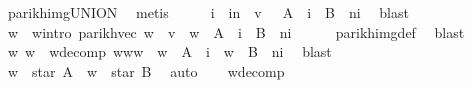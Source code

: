 \begin{isabellebody}
\ parikh{\isacharunderscore}{\kern0pt}img{\isacharunderscore}{\kern0pt}UNION\ \isamarkupfalse%
\ metis\isanewline
\ \ \isamarkupfalse%
\ \isamarkupfalse%
\ i\ \ {\isachardoublequoteopen}i{\isasymle}n\ {\isasymand}\ v\ {\isasymin}\ {\isasymPsi}\ {\isacharparenleft}{\kern0pt}A\ {\isacharcircum}{\kern0pt}{\isacharcircum}{\kern0pt}\ i\ {\isacharat}{\kern0pt}{\isacharat}{\kern0pt}\ B\ {\isacharcircum}{\kern0pt}{\isacharcircum}{\kern0pt}\ {\isacharparenleft}{\kern0pt}n{\isacharminus}{\kern0pt}i{\isacharparenright}{\kern0pt}{\isacharparenright}{\kern0pt}{\isachardoublequoteclose}\ \isamarkupfalse%
\ blast\isanewline
\ \ \isamarkupfalse%
\ \isamarkupfalse%
\ w\ \ w{\isacharunderscore}{\kern0pt}intro{\isacharcolon}{\kern0pt}\ {\isachardoublequoteopen}parikh{\isacharunderscore}{\kern0pt}vec\ w\ {\isacharequal}{\kern0pt}\ v\ {\isasymand}\ w\ {\isasymin}\ A\ {\isacharcircum}{\kern0pt}{\isacharcircum}{\kern0pt}\ i\ {\isacharat}{\kern0pt}{\isacharat}{\kern0pt}\ B\ {\isacharcircum}{\kern0pt}{\isacharcircum}{\kern0pt}\ {\isacharparenleft}{\kern0pt}n{\isacharminus}{\kern0pt}i{\isacharparenright}{\kern0pt}{\isachardoublequoteclose}\isanewline
\ \ \ \ \isamarkupfalse%
\ parikh{\isacharunderscore}{\kern0pt}img{\isacharunderscore}{\kern0pt}def\ \isamarkupfalse%
\ blast\isanewline
\ \ \isamarkupfalse%
\ \isamarkupfalse%
\ w{}\ w{}\ \ w{\isacharunderscore}{\kern0pt}decomp{\isacharcolon}{\kern0pt}\ {\isachardoublequoteopen}w{\isacharequal}{\kern0pt}w{}{\isacharat}{\kern0pt}w{}\ {\isasymand}\ w{}\ {\isasymin}\ A\ {\isacharcircum}{\kern0pt}{\isacharcircum}{\kern0pt}\ i\ {\isasymand}\ w{}\ {\isasymin}\ B\ {\isacharcircum}{\kern0pt}{\isacharcircum}{\kern0pt}\ {\isacharparenleft}{\kern0pt}n{\isacharminus}{\kern0pt}i{\isacharparenright}{\kern0pt}{\isachardoublequoteclose}\ \isamarkupfalse%
\ blast\isanewline
\ \ \isamarkupfalse%
\ \isamarkupfalse%
\ {\isachardoublequoteopen}w{}\ {\isasymin}\ star\ A{\isachardoublequoteclose}\ \ {\isachardoublequoteopen}w{}\ {\isasymin}\ star\ B{\isachardoublequoteclose}\ \isamarkupfalse%
\ auto\isanewline
\ \ \isamarkupfalse%
\ w{\isacharunderscore}{\kern0pt}decomp\ \isamarkupfalse%

\end{isabellebody}
